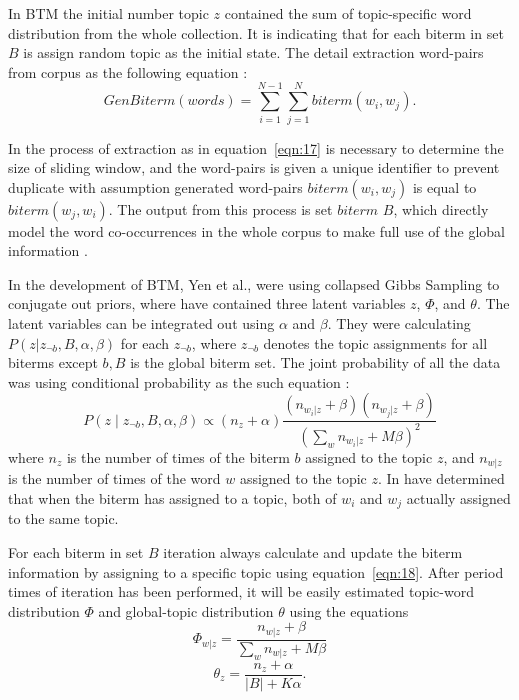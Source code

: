 In BTM the initial number topic \(z\) contained the sum of topic-specific word distribution from the whole collection. It is indicating that for each biterm in set \(B\) is assign random topic as the initial state. The detail extraction word-pairs from corpus as the following equation \cite{XuLiuWu}:
\begin{equation}
	\label{eqn:17}
	\textit{GenBiterm}(\textit{words}) = \sum_{i=1}^{N-1} \sum_{j = 1}^{N}\textit{biterm}(w_i, w_j).
\end{equation}

In the process of extraction as in equation~\cref{eqn:17} is necessary to determine the size of sliding window, and the word-pairs is given a unique identifier to prevent duplicate with assumption generated word-pairs \(\textit{biterm}(w_i,w_j)\) is equal to \(\textit{biterm}(w_j,w_i)\). The output from this process is set \(\textit{biterm } B\), which directly model the word co-occurrences in the whole corpus to make full use of the global information \cite{WangZhangLiu}.

In the development of BTM, Yen et al., were using collapsed Gibbs Sampling \cite{Griffiths} to conjugate out priors, where have contained three latent variables \(z\), \(\Phi \), and \(\theta \). The latent variables can be integrated out using \(\alpha\) and \(\beta\). They were calculating \(P(z \vert z_{\neg b}, B, \alpha, \beta)\) for each \(z_{\neg b}\), where \(z_{\neg b}\) denotes the topic assignments for all biterms except \(b, B\) is the global biterm set. The joint probability of all the data was using conditional probability as the such equation \cite{YanGuoLan,HeXuLi}:
\begin{equation}
	\label{eqn:18}
	P(z \mid z_{\neg b}, B, \alpha, \beta) \varpropto (n_z + \alpha) \frac{(n_{w_i \vert z} + \beta)(n_{w_j \vert z} + \beta)}{(\sum_{w} n_{w_i \vert z} + M\beta)^2}
\end{equation}
where \(n_z\) is the number of times of the biterm \(b\) assigned to the topic \(z\), and \(n_{w \vert z}\) is the number of times of the word \(w\) assigned to the topic \(z\). In \cite{YanGuoLan,ChengYanLan} have determined that when the biterm has assigned to a topic, both of \(w_i\) and \(w_j\) actually assigned to the same topic.

For each biterm in set \(B\) iteration always calculate and update the biterm information by assigning to a specific topic using equation~\cref{eqn:18}. After period times of iteration has been performed, it will be easily estimated topic-word distribution \(\Phi\) and global-topic distribution \(\theta\) using the equations \cite{YanGuoLan}
\begin{equation}
	\label{eqn:19}
	\Phi_{w \vert z} = \frac{n_{w \vert z}  + \beta}{\sum_{w} n_{w \vert z} + M\beta}
\end{equation}
\begin{equation}
	\label{eqn:20}
	\theta_{z} = \frac{n_{z}  + \alpha}{\lvert B \rvert + K\alpha}.
\end{equation}

